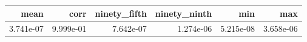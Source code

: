 \begin{tabular}{rrrrrr}
\toprule
mean & corr & ninety_fifth & ninety_ninth & min & max \\
\midrule
3.741e-07 & 9.999e-01 & 7.642e-07 & 1.274e-06 & 5.215e-08 & 3.658e-06 \\
\bottomrule
\end{tabular}
